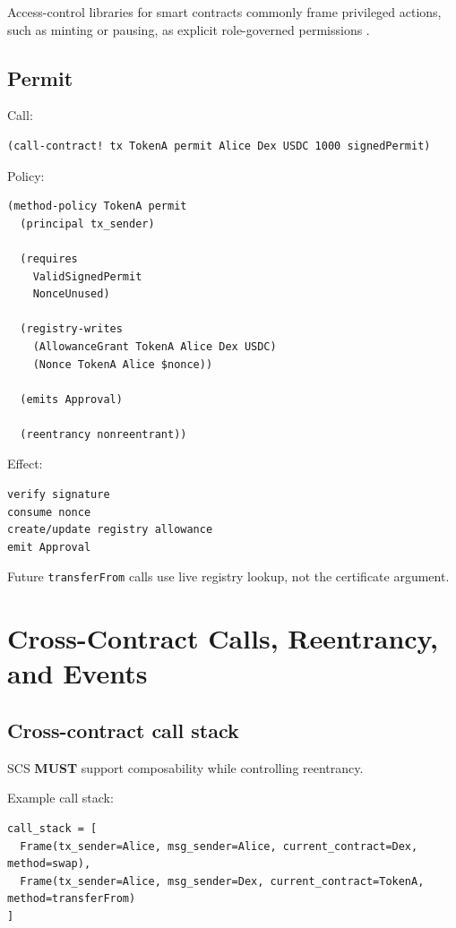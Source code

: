 \documentclass[11pt]{article}
\newcommand{\SCS}{\textsc{SCS}}
\newcommand{\MUST}{\textbf{MUST}}
\newcommand{\code}[1]{\texttt{#1}}
\begin{document}
Access-control libraries for smart contracts commonly frame privileged actions, such as minting or pausing, as explicit role-governed permissions \cite{openzeppelin-access}.

\subsection{Permit}

Call:

\begin{lstlisting}
(call-contract! tx TokenA permit Alice Dex USDC 1000 signedPermit)
\end{lstlisting}

Policy:

\begin{lstlisting}
(method-policy TokenA permit
  (principal tx_sender)

  (requires
    ValidSignedPermit
    NonceUnused)

  (registry-writes
    (AllowanceGrant TokenA Alice Dex USDC)
    (Nonce TokenA Alice $nonce))

  (emits Approval)

  (reentrancy nonreentrant))
\end{lstlisting}

Effect:

\begin{lstlisting}
verify signature
consume nonce
create/update registry allowance
emit Approval
\end{lstlisting}

Future \code{transferFrom} calls use live registry lookup, not the certificate argument.



\section{Cross-Contract Calls, Reentrancy, and Events}

\subsection{Cross-contract call stack}

\SCS{} \MUST{} support composability while controlling reentrancy.

Example call stack:

\begin{lstlisting}
call_stack = [
  Frame(tx_sender=Alice, msg_sender=Alice, current_contract=Dex, method=swap),
  Frame(tx_sender=Alice, msg_sender=Dex, current_contract=TokenA, method=transferFrom)
]
\end{lstlisting}
\end{document}
